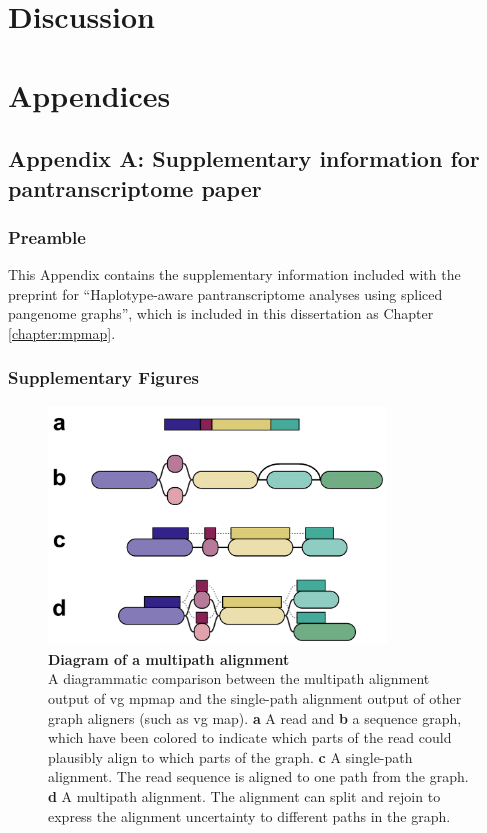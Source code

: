 \documentclass[11pt]{ucthesis}
\begin{document}
\part{Discussion}

\appendix

\part{Appendices}

\chapter{Appendix A: Supplementary information for pantranscriptome paper}

\section{Preamble}

This Appendix contains the supplementary information included with the preprint for ``Haplotype-aware pantranscriptome analyses using spliced pangenome graphs'', which is included in this dissertation as Chapter \ref{chapter:mpmap}.

\section{Supplementary Figures}

\begin{figure}[H]
\begin{center}
\includegraphics[width=0.8\textwidth]{mpmapfigures/figureS10.pdf}
\caption{\textbf{Diagram of a multipath alignment} \\
A diagrammatic comparison between the multipath alignment output of vg mpmap and the single-path alignment output of other graph aligners (such as vg map). \textbf{a} A read and \textbf{b} a sequence graph, which have been colored to indicate which parts of the read could plausibly align to which parts of the graph. \textbf{c} A single-path alignment. The read sequence is aligned to one path from the graph. \textbf{d} A multipath alignment. The alignment can split and rejoin to express the alignment uncertainty to different paths in the graph.
} \label{fig:multipath-alignment}
\end{center}
\end{figure}
\end{document}

